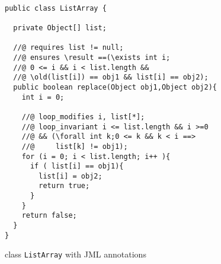\begin{figure}[ht!]
\begin{lstlisting}[frame=trbl] 

public class ListArray {

  private Object[] list;
  
  //@ requires list != null;
  //@ ensures \result ==(\exists int i; 
  //@ 0 <= i && i < list.length && 
  //@ \old(list[i]) == obj1 && list[i] == obj2);
  public boolean replace(Object obj1,Object obj2){
    int i = 0;
    
    //@ loop_modifies i, list[*];
    //@ loop_invariant i <= list.length && i >=0 
    //@ && (\forall int k;0 <= k && k < i ==> 
    //@     list[k] != obj1);
    for (i = 0; i < list.length; i++ ){
      if ( list[i] == obj1){
        list[i] = obj2;
        return true;	
      }
    }
    return false;
  }
}
\end{lstlisting}
\caption{\sc class \mbox{\rm \lstinline!ListArray!} with JML annotations} 
\label{replaceSrc}
\end{figure}



